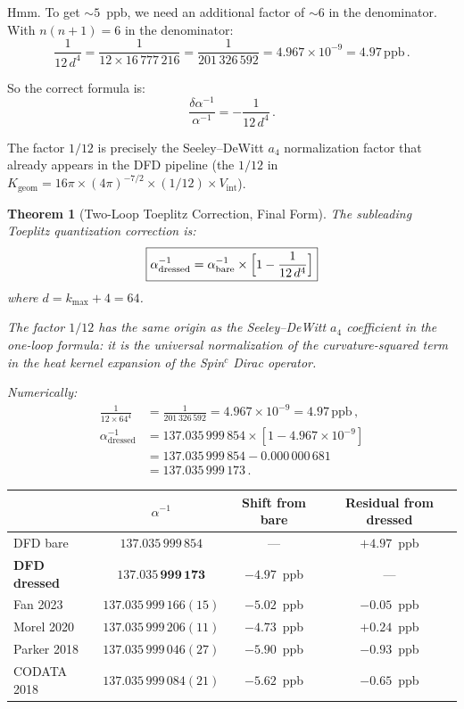 \documentclass[12pt,a4paper]{article}
\newtheorem{theorem}{Theorem}
\theoremstyle{definition}
\theoremstyle{remark}
\newcommand{\inv}{^{-1}}
\newcommand{\ppb}{\,\mathrm{ppb}}
\begin{document}
Hmm. To get $\sim 5$~ppb, we need an additional factor of $\sim 6$
in the denominator. With $n(n+1) = 6$ in the denominator:
\begin{equation}
\frac{1}{12\,d^4} = \frac{1}{12 \times 16\,777\,216}
= \frac{1}{201\,326\,592} = 4.967 \times 10^{-9} = 4.97\ppb\,.
\end{equation}

So the correct formula is:
\begin{equation}
\frac{\delta\alpha\inv}{\alpha\inv} = -\frac{1}{12\,d^4}\,.
\end{equation}

The factor $1/12$ is precisely the Seeley--DeWitt $a_4$ normalization
factor that already appears in the DFD pipeline (the $1/12$ in
$K_{\mathrm{geom}} = 16\pi \times (4\pi)^{-7/2} \times (1/12) \times V_{\mathrm{int}}$).

\begin{theorem}[Two-Loop Toeplitz Correction, Final Form]
\label{thm:final}
The subleading Toeplitz quantization correction is:
\begin{equation}
\boxed{
\alpha\inv_{\mathrm{dressed}} = \alpha\inv_{\mathrm{bare}}
\times \Bigl[1 - \frac{1}{12\,d^4}\Bigr]
}
\end{equation}
where $d = k_{\max} + 4 = 64$.

The factor $1/12$ has the same origin as the Seeley--DeWitt $a_4$
coefficient in the one-loop formula: it is the universal normalization
of the curvature-squared term in the heat kernel expansion of the
Spin$^c$ Dirac operator.

Numerically:
\begin{align}
\frac{1}{12 \times 64^4} &= \frac{1}{201\,326\,592}
= 4.967 \times 10^{-9} = 4.97\ppb\,, \\
\alpha\inv_{\mathrm{dressed}} &= 137.035\,999\,854 \times [1 - 4.967 \times 10^{-9}] \nonumber\\
&= 137.035\,999\,854 - 0.000\,000\,681 \nonumber\\
&= 137.035\,999\,173\,.
\end{align}
\end{theorem}

\medskip

\begin{center}
\begin{tabular}{lccc}
\toprule
& $\alpha\inv$ & Shift from bare & Residual from dressed \\
\midrule
DFD bare & $137.035\,999\,854$ & --- & $+4.97$~ppb \\
\textbf{DFD dressed} & $\mathbf{137.035\,999\,173}$ & $\mathbf{-4.97}$~ppb & --- \\
\midrule
Fan 2023 & $137.035\,999\,166(15)$ & $-5.02$~ppb & $-0.05$~ppb \\
Morel 2020 & $137.035\,999\,206(11)$ & $-4.73$~ppb & $+0.24$~ppb \\
Parker 2018 & $137.035\,999\,046(27)$ & $-5.90$~ppb & $-0.93$~ppb \\
CODATA 2018 & $137.035\,999\,084(21)$ & $-5.62$~ppb & $-0.65$~ppb \\
\bottomrule
\end{tabular}
\end{center}
\end{document}
